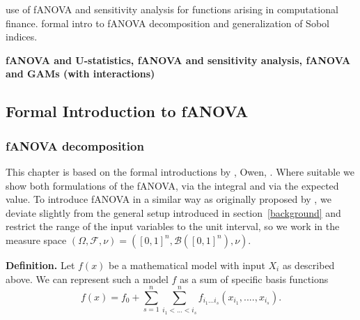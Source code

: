 \cite{liu2006} use of fANOVA and sensitivity analysis for functions arising in computational finance.
\cite{owen2013} formal intro to fANOVA decomposition and generalization of Sobol indices.

\textbf{fANOVA and U-statistics, fANOVA and sensitivity analysis, fANOVA and GAMs (with interactions)}

\subsection{Formal Introduction to fANOVA}

\subsubsection*{fANOVA decomposition}
This chapter is based on the formal introductions by \cite{sobol1993sensitivity, sobol2001, hooker2004}, Owen, \cite{muehlenstaedt2012}. Where suitable we show both formulations of the fANOVA, via the integral and via the expected value.
To introduce fANOVA in a similar way as originally proposed by \cite{sobol1993sensitivity}, we deviate slightly from the general setup introduced in section~\ref{background} and restrict the range of the input variables to the unit interval, so we work in the measure space $(\Omega, \mathcal{F}, \nu) = ([0, 1]^n, \mathcal{B}([0, 1]^n), \nu)$.


\textbf{Definition.} Let $f(x)$  be a mathematical model with input $X_i$ as described above. We can represent such a model $f$ as a sum of specific basis functions
\begin{equation}
    f(x) = f_0 + \sum_{s=1}^{n} \sum_{i_1 <...<i_s}^{n} f_{i_{1}...i_{s}} (x_{i_{1}} , ....,x_{i_{s}}).
    \label{eq:fanova_decomposition}
\end{equation}

